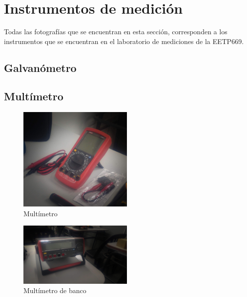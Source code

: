 \chapter{Instrumentos de medición}
Todas las fotografías que se encuentran en esta sección, corresponden a los instrumentos que se encuentran en el laboratorio de mediciones de la EETP669.
\section{Galvanómetro}
\section{Multímetro}

\begin{figure}[htbp]
  \centering
  \includegraphics[width=0.5\textwidth]{images/fotos/tester1.jpg}
  \caption{Multímetro}
  \label{fig:multimetro_1}
\end{figure}

\begin{figure}[htbp]
  \centering  
  \includegraphics[width=0.5\textwidth]{images/fotos/testerdebanco.jpg}
  \caption{Multímetro de banco}
  \label{fig:multimetro_banco}
\end{figure}

